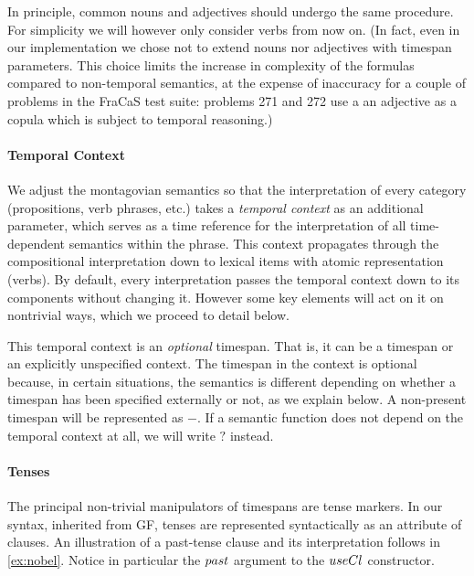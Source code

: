 \documentclass[a4paper,11pt]{article}
\begin{document}
In principle, common nouns and adjectives should undergo the same
procedure. For simplicity we will however only consider verbs from now
on. (In fact, even in our implementation we chose not to extend nouns
nor adjectives with timespan parameters. This choice limits the
increase in complexity of the formulas compared to non-temporal
semantics, at the expense of inaccuracy for a couple of problems in
the FraCaS test suite: problems 271 and 272 use a an adjective as a
copula which is subject to temporal reasoning.)

\paragraph{Temporal Context}

We adjust the montagovian semantics so that the interpretation of
every category (propositions, verb phrases, etc.) takes a
\emph{temporal context} as an additional parameter, which serves as a time
reference for the interpretation of all time-dependent semantics
within the phrase.  This context propagates through the compositional
interpretation down to lexical items with atomic representation
(verbs). By default, every interpretation passes the temporal context
down to its components without changing it. However some key elements
will act on it on nontrivial ways, which we proceed to detail below.

This temporal context is an \emph{optional} timespan. That is, it can
be a timespan or an explicitly unspecified context.
\newcommand\nospan{\ensuremath{-}}
\newcommand\anyspan{\ensuremath{\mathbf{?}}} The timespan in the context is
optional because, in certain situations, the semantics is different
depending on whether a timespan has been specified externally or not,
as we explain below. A non-present timespan will be represented as
\nospan{}. If a semantic function does not depend on the temporal
context at all, we will write \anyspan{} instead.

\paragraph{Tenses}

\newcommand\varid[1]{\mathnormal{#1}}
%
The principal non-trivial manipulators of timespans are tense
markers. In our syntax, inherited from GF, tenses are represented
syntactically as an attribute of clauses. An illustration of a
past-tense clause and its interpretation follows in
\cref{ex:nobel}. Notice in particular the $\varid{past}$ argument to
the $\varid{useCl}$ constructor.
\end{document}
